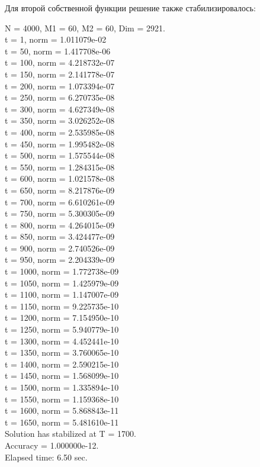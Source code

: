 \documentclass[12pt,a4paper]{article}
\begin{document}
Для второй собственной функции решение также стабилизировалось:
\begin{center}
N = 4000, M1 =  60, M2 =  60, Dim =   2921. \\
t =   1, norm = 1.011079e-02 \\
t =  50, norm = 1.417708e-06 \\
t = 100, norm = 4.218732e-07 \\
t = 150, norm = 2.141778e-07 \\
t = 200, norm = 1.073394e-07 \\
t = 250, norm = 6.270735e-08 \\
t = 300, norm = 4.627349e-08 \\
t = 350, norm = 3.026252e-08 \\
t = 400, norm = 2.535985e-08 \\
t = 450, norm = 1.995482e-08 \\
t = 500, norm = 1.575544e-08 \\
t = 550, norm = 1.284315e-08 \\
t = 600, norm = 1.021578e-08 \\
t = 650, norm = 8.217876e-09 \\
t = 700, norm = 6.610261e-09 \\
t = 750, norm = 5.300305e-09 \\
t = 800, norm = 4.264015e-09 \\
t = 850, norm = 3.424477e-09 \\
t = 900, norm = 2.740526e-09 \\
t = 950, norm = 2.204339e-09 \\
t = 1000, norm = 1.772738e-09 \\
t = 1050, norm = 1.425979e-09 \\
t = 1100, norm = 1.147007e-09 \\
t = 1150, norm = 9.225735e-10 \\
t = 1200, norm = 7.154950e-10 \\
t = 1250, norm = 5.940779e-10 \\
t = 1300, norm = 4.452441e-10 \\
t = 1350, norm = 3.760065e-10 \\
t = 1400, norm = 2.590215e-10 \\
t = 1450, norm = 1.568099e-10 \\
t = 1500, norm = 1.335894e-10 \\
t = 1550, norm = 1.159368e-10 \\
t = 1600, norm = 5.868843e-11 \\
t = 1650, norm = 5.481610e-11 \\
Solution has stabilized at T = 1700. \\
Accuracy = 1.000000e-12. \\
Elapsed time: 6.50 sec.
\end{center}
\end{document}
